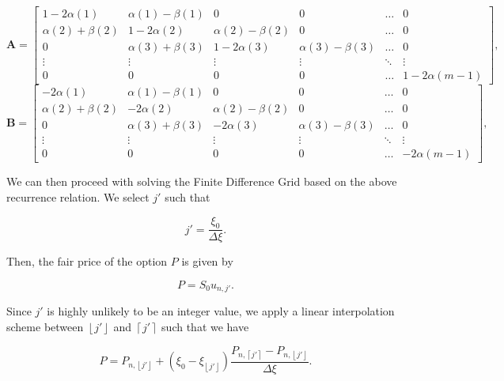 \documentclass{article}
\begin{document}
\begin{equation}
  \textbf{A} = \begin{bmatrix}
    1-2\alpha(1) & \alpha(1) - \beta(1) & 0 & 0 & \hdots & 0 \\
    \alpha(2) + \beta(2) & 1-2\alpha(2) & \alpha(2) - \beta(2) & 0 & \hdots & 0 \\
    0 & \alpha(3) + \beta(3) & 1-2\alpha(3) & \alpha(3) - \beta(3) & \hdots & 0 \\
    \vdots & \vdots & \vdots & \vdots & \ddots & \vdots \\
    0 & 0 & 0 & 0 & \hdots & 1-2\alpha(m-1)
  \end{bmatrix},
\end{equation}
\begin{equation}
  \textbf{B} = \begin{bmatrix}
    -2\alpha(1) & \alpha(1) - \beta(1) & 0 & 0 & \hdots & 0 \\
    \alpha(2) + \beta(2) & -2\alpha(2) & \alpha(2) - \beta(2) & 0 & \hdots & 0 \\
    0 & \alpha(3) + \beta(3) & -2\alpha(3) & \alpha(3) - \beta(3) & \hdots & 0 \\
    \vdots & \vdots & \vdots & \vdots & \ddots & \vdots \\
    0 & 0 & 0 & 0 & \hdots & -2\alpha(m-1)
  \end{bmatrix},
\end{equation}

We can then proceed with solving the Finite Difference Grid based on the above recurrence relation. We select \(j'\) such that

\begin{equation}
  j' = \frac{\xi_0}{\Delta\xi}.
\end{equation}

Then, the fair price of the option \(P\) is given by

\begin{equation}
  P = S_0 u_{n, j'}.
\end{equation}

Since \(j'\) is highly unlikely to be an integer value, we apply a linear interpolation scheme between \(\left \lfloor{j'}\right \rfloor\) and \(\left \lceil{j'}\right \rceil\) such that we have

\begin{equation}
  P = P_{n, \left \lfloor{j'}\right \rfloor} + (\xi_0 - \xi_{\left \lfloor{j'}\right \rfloor })\frac{P_{n, \left \lceil{j'}\right \rceil } - P_{n, \left \lfloor{j'}\right \rfloor }}{\Delta\xi}.
\end{equation}
\end{document}
